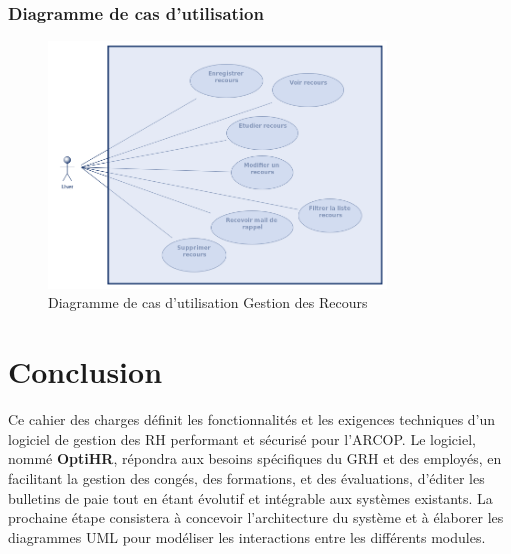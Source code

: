 \subsubsection{Diagramme de cas d'utilisation}
\begin{figure}[H]
    \centering
    \includegraphics[width=0.8\textwidth]{images/diagrammes/use-cases/Diagramme de cas d'utilisation recours.png}
    \caption{Diagramme de cas d'utilisation Gestion des Recours}
    \label{fig:use_case_gestion_conges}

\end{figure}



\section{Conclusion}
Ce cahier des charges définit les fonctionnalités et les exigences techniques d'un logiciel de gestion des \ac{RH} performant et sécurisé pour l'\ac{ARCOP}. Le logiciel, nommé \textbf{OptiHR}, répondra aux besoins spécifiques du GRH et des employés, en facilitant la gestion des congés, des formations, et des évaluations, d'éditer les bulletins de paie tout en étant évolutif et intégrable aux systèmes existants. La prochaine étape consistera à concevoir l'architecture du système et à élaborer les diagrammes UML pour modéliser les interactions entre les différents modules.
\clearpage
